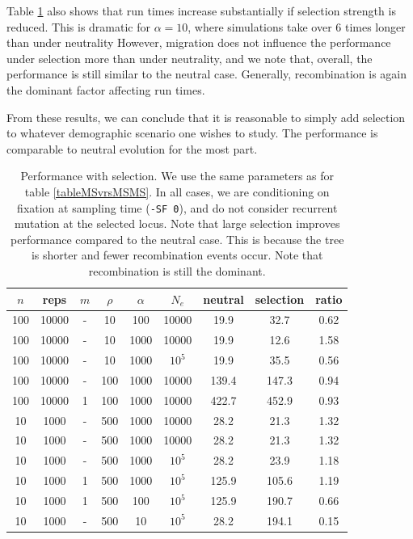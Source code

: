 \documentclass{article}
\begin{document}
Table \ref{tableSelection} also shows that run times increase substantially if
selection strength is reduced. This is dramatic for $\alpha=10$, where
simulations  take over 6 times longer than under neutrality However, migration
does not influence the performance under selection more than under neutrality,
and we note that, overall, the performance is still similar to the neutral case.
Generally, recombination is again the dominant factor affecting
run times.


From these results, we can conclude that it is reasonable to simply add
selection to whatever demographic scenario one wishes to study. The performance
is comparable to neutral evolution for the most part. 

\begin{table}[htp]
\begin{center}
\begin{tabular}{|c c c c|c c|c c|c|}
\hline
$n$ & reps & $m$ & $\rho$ & $\alpha$ & $N_e$ & neutral & selection & ratio \\
\hline \hline
100 & 10000 & - & 10 & 100 & 10000 & 19.9 & 32.7 & 0.62 \\
100 & 10000 & - & 10 & 1000 & 10000 & 19.9 & 12.6 & 1.58 \\
100 & 10000 & - & 10 & 1000 & $10^5$ & 19.9 & 35.5 &  0.56\\
100 & 10000 & - & 100 & 1000 & 10000 & 139.4 & 147.3 &  0.94\\
100 & 10000 & 1 & 100 & 1000 & 10000 & 422.7 & 452.9 &  0.93\\
\hline\hline
10 & 1000 & - & 500 & 1000 & 10000 & 28.2 & 21.3 &  1.32\\
10 & 1000 & - & 500 & 1000 & 10000 & 28.2 & 21.3 &  1.32\\
10 & 1000 & - & 500 & 1000 & $10^5$ & 28.2 & 23.9 &  1.18\\
10 & 1000 & 1 & 500 & 1000 & $10^5$ & 125.9 & 105.6 &  1.19\\
10 & 1000 & 1 & 500 & 100 & $10^5$ & 125.9 & 190.7 &  0.66\\
\hline \hline
10 & 1000 & - & 500 & 10 & $10^5$ & 28.2 & 194.1 &  0.15\\
\hline
\end{tabular}
\end{center}
\caption{Performance with selection. We use the same parameters as for
table \ref{tableMSvrsMSMS}. In all cases, we are conditioning on fixation at
sampling time ({\tt -SF 0}), and do not consider recurrent mutation at the
selected locus. Note that large selection improves performance compared to the
neutral case. This is because the tree is shorter and fewer recombination
events occur. Note that recombination is still the dominant. }
\label{tableSelection}
\end{table}
\end{document}
